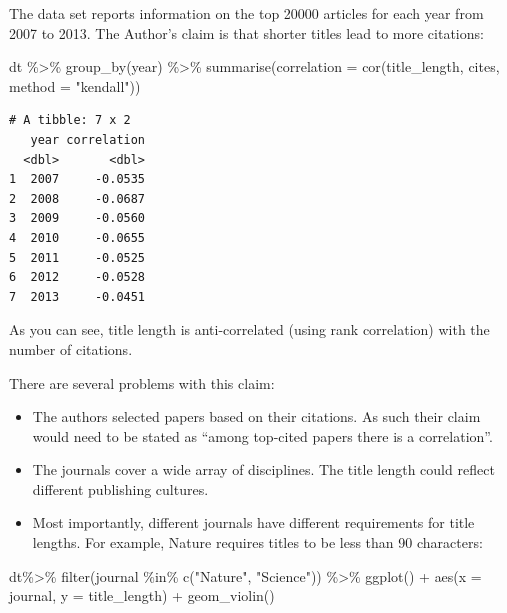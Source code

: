 \documentclass[
  letterpaper,
  DIV=11,
  numbers=noendperiod]{scrreprt}
\newenvironment{Shaded}{\begin{snugshade}}{\end{snugshade}}
\newcommand{\AttributeTok}[1]{\textcolor[rgb]{0.40,0.45,0.13}{#1}}
\newcommand{\FunctionTok}[1]{\textcolor[rgb]{0.28,0.35,0.67}{#1}}
\newcommand{\NormalTok}[1]{\textcolor[rgb]{0.00,0.23,0.31}{#1}}
\newcommand{\SpecialCharTok}[1]{\textcolor[rgb]{0.37,0.37,0.37}{#1}}
\newcommand{\StringTok}[1]{\textcolor[rgb]{0.13,0.47,0.30}{#1}}
\providecommand{\tightlist}{%
  \setlength{\itemsep}{0pt}\setlength{\parskip}{0pt}}\usepackage{longtable,booktabs,array}
\begin{document}
The data set reports information on the top 20000 articles for each year
from 2007 to 2013. The Author's claim is that shorter titles lead to
more citations:

\begin{Shaded}
\begin{Highlighting}[]
\NormalTok{dt }\SpecialCharTok{\%\textgreater{}\%} 
  \FunctionTok{group\_by}\NormalTok{(year) }\SpecialCharTok{\%\textgreater{}\%} 
  \FunctionTok{summarise}\NormalTok{(}\AttributeTok{correlation =} \FunctionTok{cor}\NormalTok{(title\_length, cites, }\AttributeTok{method =} \StringTok{"kendall"}\NormalTok{))}
\end{Highlighting}
\end{Shaded}

\begin{verbatim}
# A tibble: 7 x 2
   year correlation
  <dbl>       <dbl>
1  2007     -0.0535
2  2008     -0.0687
3  2009     -0.0560
4  2010     -0.0655
5  2011     -0.0525
6  2012     -0.0528
7  2013     -0.0451
\end{verbatim}

As you can see, title length is anti-correlated (using rank correlation)
with the number of citations.

There are several problems with this claim:

\begin{itemize}
\tightlist
\item
  The authors selected papers based on their citations. As such their
  claim would need to be stated as ``among top-cited papers there is a
  correlation''.
\item
  The journals cover a wide array of disciplines. The title length could
  reflect different publishing cultures.
\item
  Most importantly, different journals have different requirements for
  title lengths. For example, Nature requires titles to be less than 90
  characters:
\end{itemize}

\begin{Shaded}
\begin{Highlighting}[]
\NormalTok{dt}\SpecialCharTok{\%\textgreater{}\%} \FunctionTok{filter}\NormalTok{(journal }\SpecialCharTok{\%in\%} \FunctionTok{c}\NormalTok{(}\StringTok{"Nature"}\NormalTok{, }\StringTok{"Science"}\NormalTok{)) }\SpecialCharTok{\%\textgreater{}\%} 
  \FunctionTok{ggplot}\NormalTok{() }\SpecialCharTok{+} \FunctionTok{aes}\NormalTok{(}\AttributeTok{x =}\NormalTok{ journal, }\AttributeTok{y =}\NormalTok{ title\_length) }\SpecialCharTok{+} \FunctionTok{geom\_violin}\NormalTok{()}
\end{Highlighting}
\end{Shaded}
\end{document}
